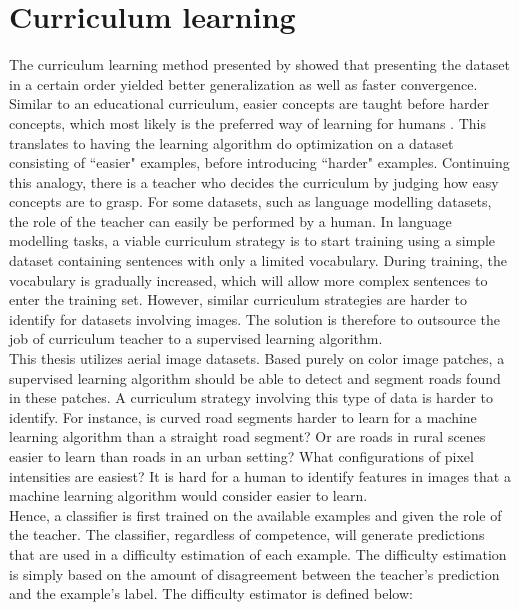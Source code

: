 \section{Curriculum learning}
\label{sec:curriculum_Learning}
The curriculum learning method presented by \cite{Bengio_curriculumlearning} showed that presenting the dataset in a certain order yielded better generalization as well as faster convergence. Similar to an educational curriculum, easier concepts are taught before harder concepts, which most likely is the preferred way of learning for humans \citep{Khan_human_teach}. This translates to having the learning algorithm do optimization on a dataset consisting of ``easier" examples, before introducing ``harder" examples. Continuing this analogy, there is a teacher who decides the curriculum by judging how easy concepts are to grasp. For some datasets, such as language modelling datasets, the role of the teacher can easily be performed by a human. In language modelling tasks, a viable curriculum strategy is to start training using a simple dataset containing sentences with only a limited vocabulary. During training, the vocabulary is gradually increased, which will allow more complex sentences to enter the training set. However, similar curriculum strategies are harder to identify for  datasets involving images. The solution is therefore to outsource the job of curriculum teacher to a supervised learning algorithm.  \\

This thesis utilizes aerial image datasets. Based purely on color image patches, a supervised learning algorithm should be able to detect and segment roads found in these patches. A curriculum strategy involving this type of data is harder to identify. For instance, is  curved road segments harder to learn for a machine learning algorithm than a straight road segment? Or are roads in rural scenes easier to learn than roads in an urban setting? What configurations of pixel intensities are easiest? It is hard for a human to identify features in images that a machine learning algorithm would consider easier to learn. \\


Hence, a classifier is first trained on the available examples and given the role of the teacher. The classifier, regardless of competence, will generate predictions that are used in a difficulty estimation of each example. The difficulty estimation is simply based on the amount of disagreement between the teacher's prediction and the example's label. The difficulty estimator is defined below:  \\

